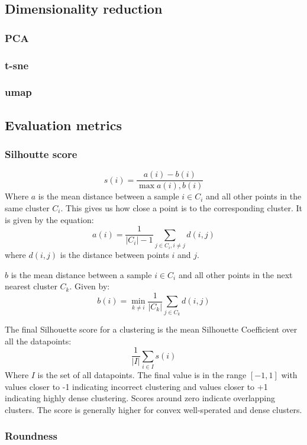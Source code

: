 \documentclass[11pt]{article}
\begin{document}
\subsection{Dimensionality reduction}
\label{sec:orgb502774}
\subsubsection{PCA}
\label{sec:org93f3c9b}
\subsubsection{t-sne}
\label{sec:orgadaa38f}
\subsubsection{umap}
\label{sec:org6a758a8}

\subsection{Evaluation metrics}
\label{sec:org078e27c}
\subsubsection{Silhoutte score}
\label{sec:org8d91088}


\[s(i) = \frac{a(i) - b(i)}{\max{a(i), b(i)}} \]
Where \(a\) is the mean distance between a sample \(i \in C_{i}\) and all other points in the same cluster \(C_{i}\). This gives us how close a point is to the corresponding cluster. It is given by the equation:
\[ a(i) = \frac{1}{|C_{i}| - 1} \sum_{j \in C_{i}, i \neq j}{d(i,j)}\]
where \(d(i,j)\) is the distance between points \(i\) and \(j\).

\(b\) is the mean distance between a sample \(i \in C_{i}\) and all other points in the next nearest cluster \(C_{k}\). Given by:
\[ b(i) = \min_{k \neq i}{\frac{1}{|C_{k}|} \sum_{j \in C_{k}}{d(i,j)}} \]

The final Silhouette score for a clustering is the mean Silhouette Coefficient over all the datapoints:
\[ \frac{1}{|I|}\sum_{i \in I}{s(i)} \]
Where \(I\) is the set of all datapoints. The final value is in the range \([-1, 1]\) with values closer to -1 indicating incorrect clustering and values closer to +1 indicating highly dense clustering. Scores around zero indicate overlapping clusters. The score is generally higher for convex well-sperated and dense clusters.

\subsubsection{Roundness}
\label{sec:org7b61201}
\end{document}
